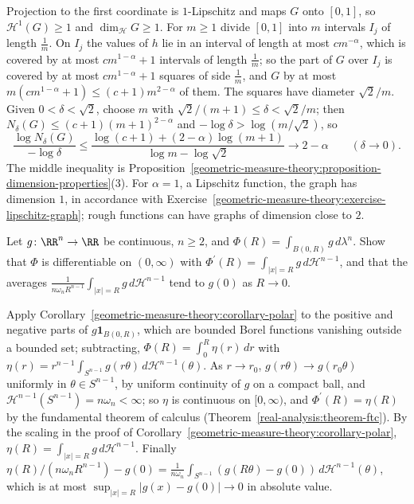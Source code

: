 \begin{solution}
Projection to the first coordinate is $1$-Lipschitz and maps $G$ onto $[0, 1]$, so $\mathcal{H}^1(G) \geq 1$ and $\dim_{\mathcal{H}}G \geq 1$. For $m \geq 1$ divide $[0, 1]$ into $m$ intervals $I_j$ of
length $\frac1m$. On $I_j$ the values of $h$ lie in an interval of length at most $cm^{-\alpha}$, which is covered by at most $cm^{1-\alpha} + 1$ intervals of length $\frac1m$; so the part of $G$ over
$I_j$ is covered by at most $cm^{1-\alpha} + 1$ squares of side $\frac1m$, and $G$ by at most $m(cm^{1-\alpha} + 1) \leq (c + 1)m^{2-\alpha}$ of them. The squares have diameter $\sqrt2/m$. Given
$0 < \delta < \sqrt2$, choose $m$ with $\sqrt2/(m + 1) \leq \delta < \sqrt2/m$; then $N_\delta(G) \leq (c + 1)(m + 1)^{2-\alpha}$ and $-\log\delta > \log(m/\sqrt2)$, so
\[
\frac{\log N_\delta(G)}{-\log\delta} \leq \frac{\log(c + 1) + (2 - \alpha)\log(m + 1)}{\log m - \log\sqrt2} \to 2 - \alpha \qquad (\delta \to 0).
\]
The middle inequality is Proposition~\ref{geometric-measure-theory:proposition-dimension-properties}(3). For $\alpha = 1$, a Lipschitz function, the graph has dimension $1$, in accordance with
Exercise~\ref{geometric-measure-theory:exercise-lipschitz-graph}; rough functions can have graphs of dimension close to $2$.
\end{solution}

\begin{exercise}\label{geometric-measure-theory:exercise-ball-derivative}
Let $g \colon \RR^n \to \RR$ be continuous, $n \geq 2$, and $\Phi(R) = \int_{B(0, R)}g\,d\lambda^n$. Show that $\Phi$ is differentiable on $(0, \infty)$ with
$\Phi^{\prime}(R) = \int_{|x| = R}g\,d\mathcal{H}^{n-1}$, and that the averages $\frac1{n\omega_nR^{n-1}}\int_{|x| = R}g\,d\mathcal{H}^{n-1}$ tend to $g(0)$ as $R \to 0$.
\end{exercise}

\begin{solution}
Apply Corollary~\ref{geometric-measure-theory:corollary-polar} to the positive and negative parts of $g\mathbf{1}_{B(0, R)}$, which are bounded Borel functions vanishing outside a bounded set; subtracting,
$\Phi(R) = \int_0^R\eta(r)\,dr$ with $\eta(r) = r^{n-1}\int_{S^{n-1}}g(r\theta)\,d\mathcal{H}^{n-1}(\theta)$. As $r \to r_0$, $g(r\theta) \to g(r_0\theta)$ uniformly in $\theta \in S^{n-1}$, by uniform
continuity of $g$ on a compact ball, and $\mathcal{H}^{n-1}(S^{n-1}) = n\omega_n < \infty$; so $\eta$ is continuous on $[0, \infty)$, and $\Phi^{\prime}(R) = \eta(R)$ by the fundamental theorem of calculus
(Theorem~\ref{real-analysis:theorem-ftc}). By the scaling in the proof of Corollary~\ref{geometric-measure-theory:corollary-polar}, $\eta(R) = \int_{|x| = R}g\,d\mathcal{H}^{n-1}$. Finally
$\eta(R)/(n\omega_nR^{n-1}) - g(0) = \frac{1}{n\omega_n}\int_{S^{n-1}}(g(R\theta) - g(0))\,d\mathcal{H}^{n-1}(\theta)$, which is at most $\sup_{|x| = R}|g(x) - g(0)| \to 0$ in absolute value.
\end{solution}

